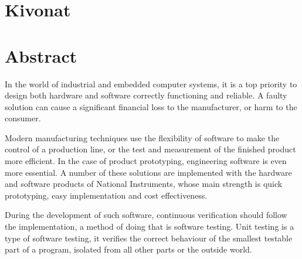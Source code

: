 \setcounter{page}{1}

\selecthungarian

\chapter*{Kivonat}



\vfill
\selectenglish


\chapter*{Abstract}


In the world of industrial and embedded computer systems, it is a top priority to design both hardware and software correctly functioning and reliable. A faulty solution can cause a significant financial loss to the manufacturer, or harm to the consumer. 

Modern manufacturing techniques use the flexibility of software to make the control of a production line, or the test and measurement of the finished product more efficient. In the case of product prototyping, engineering software is even more essential. A number of these solutions are implemented with the hardware and software products of National Instruments, whose main strength is quick prototyping, easy implementation and cost effectiveness.

During the development of such software, continuous verification should follow the implementation, a method of doing that is software testing. Unit testing is a type of software testing, it verifies the correct behaviour of the smallest testable part of a program, isolated from all other parts or the outside world.

